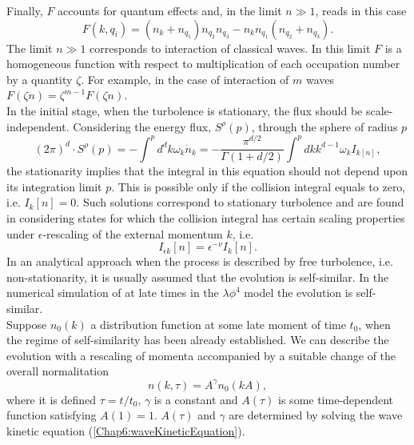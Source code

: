 \documentclass[11pt,a4paper,twoside]{book}
\begin{document}
Finally, $ F $ accounts for quantum effects and, in the limit $ n\gg 1 $, reads in this case
\begin{equation}
\label{Chap6:quantumEffectsf}
F(k,q_{i}) = (n_{k} + n_{q_{1}})n_{q_{2}}n_{q_{3}} - n_{k}n_{q_{1}}(n_{q_{2}} + n_{q_{3}}).
\end{equation}
The limit $ n\gg 1 $ corresponds to interaction of classical waves.
In this limit $ F  $ is a homogeneous function with  respect to multiplication of each occupation number by a quantity $\zeta$. For example, in the case of interaction of $ m $ waves $ F(\zeta n)=\zeta^{m-1}F(\zeta n) $.\\
In the initial stage, when the turbolence is stationary, the flux should be scale-independent. Considering the energy flux, $ S^{\rho}(p) $, through the sphere of radius $ p $
\begin{equation}
\label{Chap6:energyFluxRaidus}
(2\pi)^{d} \cdot S^{\rho}(p)=-\int^{p} d^{d}k \omega_{k} \dot{n}_{k}=-\frac{\pi^{d/2}}{\Gamma(1+d/2)}\int^{p}dkk^{d-1}\omega_{k}I_{k[n]_{}},
\end{equation}
the stationarity implies that the  integral in this equation should not depend upon its integration limit $ p $. This is possible only if the collision integral equals to zero, i.e. $ I_{k}[n]=0 $. Such solutions correspond to stationary turbolence and are found in \cite{Chap6:TurbolentThermalitation} considering states for which the collision integral has certain scaling properties under $\epsilon$-rescaling of the external momentum $ k $, i.e. 
\begin{equation}
\label{Chap6:rescalingCollisionIntegral}
I_{\epsilon k}[n]=\epsilon^{-\nu}I_{k}[n].
\end{equation}
In an analytical approach when the process is described by free turbolence, i.e. non-stationarity, it is usually assumed that the evolution is self-similar. In the numerical simulation of \cite{Chap6:TurbolentThermalitation} at late times in the $ \lambda \phi^{4} $ model the evolution is self-similar.\\
Suppose $ n_{0}(k) $ a distribution function at some late moment of time $ t_{0} $, when the regime of self-similarity has been already established. We can describe the evolution with a rescaling of momenta accompanied by a suitable change of the overall normalitation
\begin{equation}
\label{Chap6:evolutionSelfSimilarGeneral}
n(k,\tau)=A^{\gamma}n_{0}(kA),
\end{equation} 
where it is defined $ \tau=t/t_{0} $, $\gamma$ is a constant and $ A(\tau) $ is some time-dependent function satisfying $ A(1)=1 $. $ A(\tau) $ and $\gamma$ are determined by solving the wave kinetic equation (\ref{Chap6:waveKineticEquation}).\\
\end{document}

